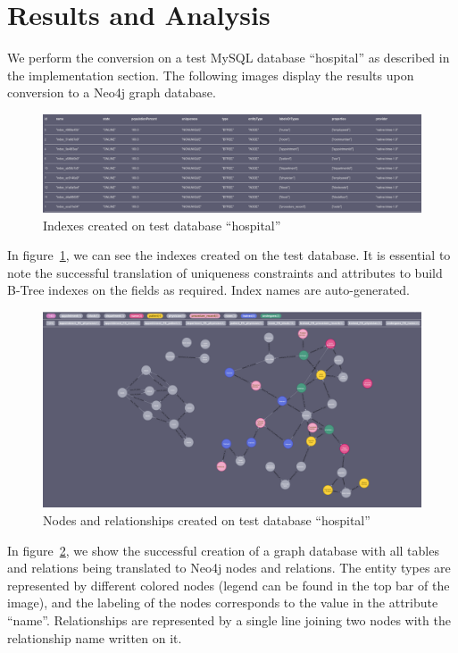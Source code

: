 \documentclass[12pt]{article}
\newcommand{\sectionfontstyle}{\fontsize{16pt}{1em}\usefont{T1}{phv}{b}{n}}
\begin{document}
    \newpage

    \section{\sectionfontstyle Results and Analysis}
    We perform the conversion on a test MySQL database ``hospital'' as described in the implementation section. The following images display the results upon conversion to a Neo4j graph database.

    \begin{figure}[htb!]
        \centering
        \includegraphics[width=155mm]{img/created_indices.png}
        \caption{Indexes created on test database ``hospital''}
        \label{fig:created_indices}
    \end{figure}

    In figure~\ref{fig:created_indices}, we can see the indexes created on the test database. It is essential to note the successful translation of uniqueness constraints and attributes to build B-Tree indexes on the fields as required. Index names are auto-generated.

    \begin{figure}[htb!]
        \centering
        \includegraphics[width=155mm]{img/created_nodes.png}
        \caption{Nodes and relationships created on test database ``hospital''}
        \label{fig:nodes_rels}
    \end{figure}

    In figure~\ref{fig:nodes_rels}, we show the successful creation of a graph database with all tables and relations being translated to Neo4j nodes and relations. The entity types are represented by different colored nodes (legend can be found in the top bar of the image), and the labeling of the nodes corresponds to the value in the attribute ``name''. Relationships are represented by a single line joining two nodes with the relationship name written on it. 
\end{document}
